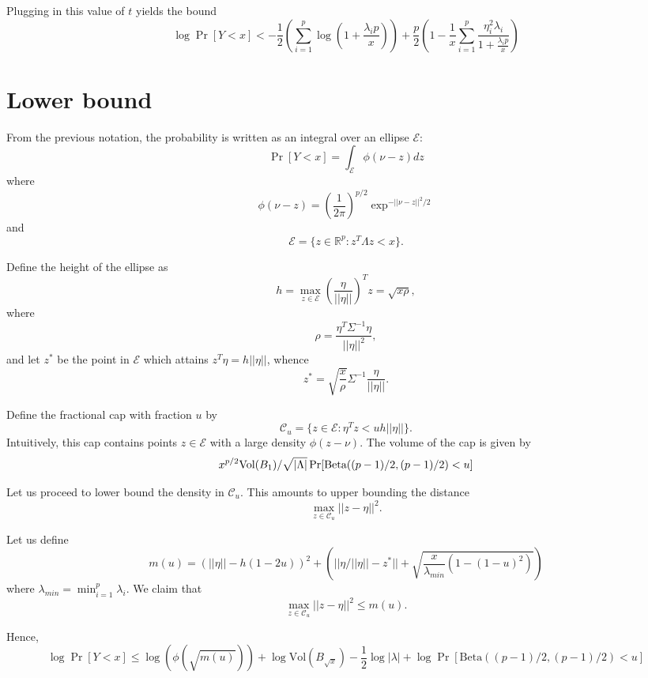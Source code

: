 \documentclass[12pt]{article}
\begin{document}
Plugging in this value of $t$ yields the bound
\[
\log \Pr[Y < x] < -\frac{1}{2}\left(\sum_{i=1}^p \log\left(1 + \frac{\lambda_i p}{x}\right)\right) + 
\frac{p}{2} \left(1 - \frac{1}{x}\sum_{i=1}^p \frac{\eta_i^2 \lambda_i}{1 + \frac{\lambda_i p}{x}}\right)
\]

\section{Lower bound}

From the previous notation, the probability is written as an integral over an ellipse $\mathcal{E}$:
\[
\Pr[Y < x] = \int_{\mathcal{E}} \phi(\nu - z) dz
\]
where
\[
\phi(\nu - z) = \left(\frac{1}{2\pi}\right)^{p/2} \exp^{-||\nu - z||^2/2}
\]
and
\[
\mathcal{E} = \{z \in \mathbb{R}^p: z^T \Lambda z < x\}.
\]

Define the height of the ellipse as
\[
h = \max_{z \in \mathcal{E}} \left(\frac{\eta}{||\eta||}\right)^T z = \sqrt{x \rho},
\]
where
\[
\rho = \frac{\eta^T \Sigma^{-1}\eta}{||\eta||^2},
\]
and let $z^*$ be the point in $\mathcal{E}$ which attains $z^T\eta = h||\eta||$,
whence
\[
z^* = \sqrt{\frac{x}{\rho}} \Sigma^{-1} \frac{\eta}{||\eta||}.
\]


Define the fractional cap with fraction $u$ by
\[
\mathcal{C}_u = \{z \in \mathcal{E}: \eta^T z < uh||\eta|| \}.
\]
Intuitively, this cap contains points $z \in \mathcal{E}$ with a large density $\phi(z - \nu)$.
The volume of the cap is given by
\[
x^{p/2}\text{Vol}(B_1)/\sqrt{|\Lambda|}\Pr[\text{Beta}((p-1)/2, (p-1)/2) < u]
\]

Let us proceed to lower bound the density in $\mathcal{C}_u$.
This amounts to upper bounding the distance
\[
\max_{z \in \mathcal{C}_u} ||z - \eta||^2.
\]

Let us define
\[
m(u) = (||\eta|| - h(1-2u))^2 + \left(||\eta/||\eta|| - z^*|| + \sqrt{\frac{x}{\lambda_{min}} (1-(1-u)^2)}\right)
\]
where $\lambda_{min} = \min_{i=1}^p \lambda_i$.
We claim that
\[
\max_{z \in \mathcal{C}_u} ||z - \eta||^2 \leq m(u).
\]

Hence,
\[
\log\Pr[Y < x] \leq \log(\phi(\sqrt{m(u)})) + \log\text{Vol}(B_{\sqrt{x}}) - \frac{1}{2}\log|\lambda|
+ \log \Pr[\text{Beta}((p-1)/2, (p-1)/2) < u]
\]
\end{document}
